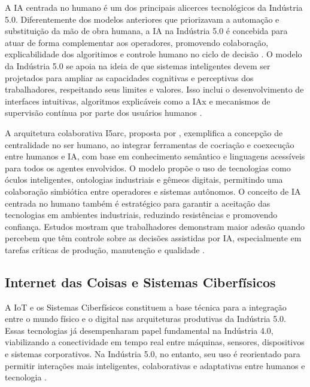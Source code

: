 A \gls{IA} centrada no humano é um dos principais alicerces tecnológicos da Indústria 5.0.
Diferentemente dos modelos anteriores que priorizavam a automação e substituição da mão de obra humana, a \gls{IA} na Indústria 5.0 é concebida para atuar de forma complementar aos operadores, promovendo colaboração, explicabilidade dos algoritimos e controle humano no ciclo de decisão \cite{TOTH2023, PIZON2023}.
O modelo da Indústria 5.0 se apoia na ideia de que sistemas inteligentes devem ser projetados para ampliar as capacidades cognitivas e perceptivas dos trabalhadores, respeitando seus limites e valores. Isso inclui o desenvolvimento de interfaces intuitivas, algoritmos explicáveis como a \gls{IAx}  e mecanismos de supervisão contínua por parte dos usuários humanos \cite{TOTH2023, VALETTE2023}.


A arquitetura colaborativa I5arc, proposta por \cite{TOTH2023}, exemplifica a concepção de centralidade no ser humano, ao integrar ferramentas de cocriação e coexecução entre humanos e \gls{IA}, com base em conhecimento semântico e linguagens acessíveis para todos os agentes envolvidos.
O modelo propõe o uso de tecnologias como óculos inteligentes, ontologias industriais e gêmeos digitais, permitindo uma colaboração simbiótica entre operadores e sistemas autônomos.
O conceito de \gls{IA} centrada no humano também é estratégico para garantir a aceitação das tecnologias em ambientes industriais, reduzindo resistências e promovendo confiança.
Estudos mostram que trabalhadores demonstram maior adesão quando percebem que têm controle sobre as decisões assistidas por \gls{IA}, especialmente em tarefas críticas de produção, manutenção e qualidade \cite{Santana_2023,Sousa2024}.

\subsection{Internet das Coisas e Sistemas Ciberfísicos}

A \gls{IoT} e os Sistemas Ciberfísicos constituem a base técnica para a integração entre o mundo físico e o digital nas arquiteturas produtivas da Indústria 5.0.
Essas tecnologias já desempenharam papel fundamental na Indústria 4.0, viabilizando a conectividade em tempo real entre máquinas, sensores, dispositivos e sistemas corporativos.
Na Indústria 5.0, no entanto, seu uso é reorientado para permitir interações mais inteligentes, colaborativas e adaptativas entre humanos e tecnologia \cite{VALETTE2023, PIZON2023}.

